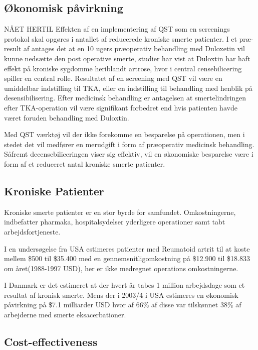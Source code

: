 \subsection{Økonomisk påvirkning} NÅET HERTIL
Effekten af en implementering af QST som en screenings protokol skal opgøres i antallet af reducerede kroniske smerte patienter. I et præ-result af  antages det at en 10 ugers præoperativ behandling med Duloxetin vil kunne nedsætte den post operative smerte, studier har vist at Duloxtin har haft effekt på kroniske sygdomme heriblandt artrose, hvor i central censebilicering spiller en central rolle. \citep{Blikman2016} Resultatet af en screening med QST vil være en umiddelbar indstilling til TKA, eller en indstilling til behandling med henblik på desensibilisering. Efter medicinsk behandling er antagelsen at smertelindringen efter TKA-operation vil være signifikant forbedret end hvis patienten havde været foruden behandling med Duloxtin.

Med QST værktøj vil der ikke forekomme en besparelse på operationen, men i stedet det vil medfører en merudgift i form af præoperativ medicinsk behandling. Såfremt decensebiliceringen viser sig effektiv, vil en økonomiske besparelse være i form af et reduceret antal kroniske smerte patienter.

\subsection{Kroniske Patienter}

Kroniske smerte patienter er en stor byrde for samfundet. Omkostningerne, indbefatter pharmaka, hospitalsydelser yderligere operationer samt tabt arbejdsfortjeneste. 

I en undersøgelse fra USA estimeres patienter med Reumatoid artrit til at koste mellem \$500 til \$35.400 med en gennemsnitligomkostning på \$12.900 til \$18.833  om året(1988-1997 USD), her er ikke medregnet operations omkostningerne.\citep{Turk2002}

I Danmark er det estimeret at der hvert år tabes 1 million arbejdsdage som et resultat af kronisk smerte.\citep{Eriksen2006} Mens der i 2003/4 i USA estimeres en økonomisk påvirkning på \$7.1 milliarder USD hvor af 66\% af disse var tilskønnet 38\% af arbejderne med smerte eksacerbationer. \citep{Phillips2009}

\subsection{Cost-effectiveness}

